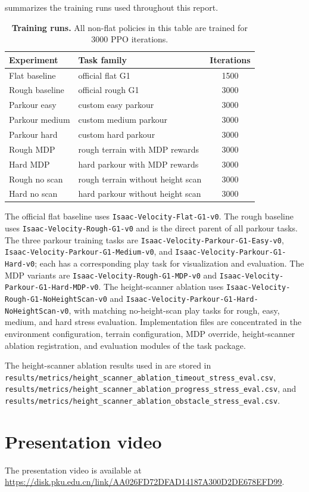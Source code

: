 \documentclass{article}
\begin{document}
 summarizes the training runs used throughout this report.

\begin{table}[h]
    \caption{\textbf{Training runs.} All non-flat policies in this table are trained for 3000 PPO iterations.}
    \label{tab:runs}
    \centering
    \begin{tabular}{llc}
        \toprule
        Experiment & Task family & Iterations \\
        \midrule
        Flat baseline & official flat G1 & 1500 \\
        Rough baseline & official rough G1 & 3000 \\
        Parkour easy & custom easy parkour & 3000 \\
        Parkour medium & custom medium parkour & 3000 \\
        Parkour hard & custom hard parkour & 3000 \\
        Rough MDP & rough terrain with MDP rewards & 3000 \\
        Hard MDP & hard parkour with MDP rewards & 3000 \\
        Rough no scan & rough terrain without height scan & 3000 \\
        Hard no scan & hard parkour without height scan & 3000 \\
        \bottomrule
    \end{tabular}
\end{table}

The official flat baseline uses \texttt{Isaac-Velocity-Flat-G1-v0}. The rough baseline uses \texttt{Isaac-Velocity-Rough-G1-v0} and is the direct parent of all parkour tasks. The three parkour training tasks are \texttt{Isaac-Velocity-Parkour-G1-Easy-v0}, \texttt{Isaac-Velocity-Parkour-G1-Medium-v0}, and \texttt{Isaac-Velocity-Parkour-G1-Hard-v0}; each has a corresponding play task for visualization and evaluation. The MDP variants are \texttt{Isaac-Velocity-Rough-G1-MDP-v0} and \texttt{Isaac-Velocity-Parkour-G1-Hard-MDP-v0}. The height-scanner ablation uses \texttt{Isaac-Velocity-Rough-G1-NoHeightScan-v0} and \texttt{Isaac-Velocity-Parkour-G1-Hard-NoHeightScan-v0}, with matching no-height-scan play tasks for rough, easy, medium, and hard stress evaluation. Implementation files are concentrated in the environment configuration, terrain configuration, MDP override, height-scanner ablation registration, and evaluation modules of the task package.

The height-scanner ablation results used in  are stored in \texttt{results/metrics/height\_scanner\_ablation\_timeout\_stress\_eval.csv}, \texttt{results/metrics/height\_scanner\_ablation\_progress\_stress\_eval.csv}, and \texttt{results/metrics/height\_scanner\_ablation\_obstacle\_stress\_eval.csv}.

\section{Presentation video}
\label{app:presentation-video}

The presentation video is available at
\url{https://disk.pku.edu.cn/link/AA026FD72DFAD14187A300D2DE678EFD99}.
\end{document}

